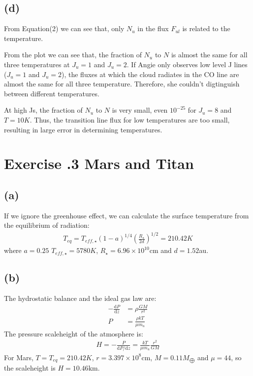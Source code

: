 \documentclass[a4paper,12pt]{article}
\renewcommand{\d}{\mathrm{d}}
\newcommand{\cm}{\mathrm{cm}}
\begin{document}
\subsection*{(d)}
From Equation(2) we can see that, only $N_u$ in the flux $F_{ul}$ is related to the temperature.

From the plot we can see that, the fraction of $N_u$ to $N$ is almost the same for all three temperatures at $J_u=1$ and $J_u = 2$. 
If Angie only observes low level J lines ($J_u=1$ and $J_u = 2$), the fluxes at which the cloud radiates in the CO line are 
almost the same for all three temperature. Therefore, she couldn't digtinguish between different temperatures.

At high Js, the fraction of $N_u$ to $N$ is very small, even $10^{-25}$ for $J_u=8$ and $T=10K$. Thus, the transition line flux 
for low temperatures are too small, resulting in large error in determining temperatures.

\section*{\textbf{Exercise \uppercase\expandafter{}.3 Mars and Titan}}
\subsection*{(a)}
If we ignore the greenhouse effect, we can calculate the 
surface temperature from the equilibrium of radiation:
\begin{align*}
    T_{eq} = T_{eff, \star} (1-a)^{1/4} (\frac{R_\star}{2d})^{1/2} = 210.42 K
\end{align*}
where $a=0.25$ $T_{eff, \star}=5780K$, $R_\star = 6.96 \times 10^{10} \cm$ and $d=1.52$au.

\subsection*{(b)}
The hydrostatic balance and the ideal gas law are:
\begin{align*}
    -\frac{\d P}{\d z} &= \rho \frac{GM}{r^2} \\
    P &= \frac{\rho kT}{\mu m_u}
\end{align*}
The pressure scaleheight of the atmosphere is:
\begin{align*}
    H = -\frac{P}{\d P/ \d z} = \frac{kT}{\mu m_u} \frac{r^2}{GM}
\end{align*}
For Mars, $T = T_{eq} = 210.42 K$, $r = 3.397\times10^8 \cm$, 
$M = 0.11 M_{\bigoplus}$ and $\mu=44$, so the scaleheight is $H = 10.46 \text{km}$.
\end{document}
